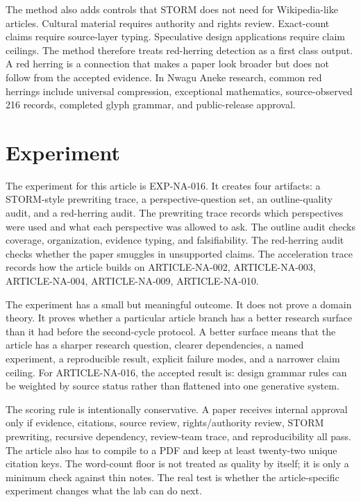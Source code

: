 \documentclass[sigconf,nonacm]{acmart}
\begin{document}
The method also adds controls that STORM does not need for Wikipedia-like
articles. Cultural material requires authority and rights review. Exact-count
claims require source-layer typing. Speculative design applications require
claim ceilings. The method therefore treats red-herring detection as a first
class output. A red herring is a connection that makes a paper look broader but
does not follow from the accepted evidence. In Nwagu Aneke research, common red
herrings include universal compression, exceptional mathematics, source-observed
216 records, completed glyph grammar, and public-release approval.

\section{Experiment}
The experiment for this article is EXP-NA-016. It creates four artifacts: a
STORM-style prewriting trace, a perspective-question set, an outline-quality
audit, and a red-herring audit. The prewriting trace records which perspectives
were used and what each perspective was allowed to ask. The outline audit checks
coverage, organization, evidence typing, and falsifiability. The red-herring
audit checks whether the paper smuggles in unsupported claims. The acceleration
trace records how the article builds on ARTICLE-NA-002, ARTICLE-NA-003, ARTICLE-NA-004, ARTICLE-NA-009, ARTICLE-NA-010.

The experiment has a small but meaningful outcome. It does not prove a domain
theory. It proves whether a particular article branch has a better research
surface than it had before the second-cycle protocol. A better surface means
that the article has a sharper research question, clearer dependencies, a named
experiment, a reproducible result, explicit failure modes, and a narrower claim
ceiling. For ARTICLE-NA-016, the accepted result is: design grammar rules can be weighted by source status rather than flattened into one generative system.

The scoring rule is intentionally conservative. A paper receives internal
approval only if evidence, citations, source review, rights/authority review,
STORM prewriting, recursive dependency, review-team trace, and reproducibility
all pass. The article also has to compile to a PDF and keep at least twenty-two
unique citation keys. The word-count floor is not treated as quality by itself;
it is only a minimum check against thin notes. The real test is whether the
article-specific experiment changes what the lab can do next.
\end{document}
